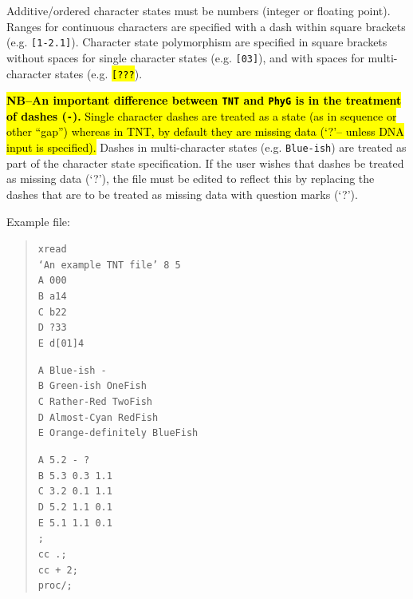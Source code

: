 \begin{description}
		 Additive/ordered character states must be numbers (integer or floating point). Ranges 
		 for continuous characters are specified with a dash within square brackets (e.g. 
		 \texttt{[1-2.1]}). Character state polymorphism are specified in square brackets without 
		 spaces for single character states (e.g. \texttt{[03]}), and with spaces for multi-character 
		 states (e.g. \hl{\texttt{[???}}).
		  
		 \hl{\textbf{NB--An important difference between \texttt{TNT} and \texttt{PhyG} is in the 
		 treatment of dashes (\texttt{-}).} Single character dashes are treated as a state (as in 
		 sequence or other ``gap'') whereas in TNT, by default they are missing data (`?'-- 
		 unless DNA input is specified).} Dashes in multi-character states (e.g. \texttt{Blue-ish}) 
		 are treated as part of the character state specification. If the user wishes that dashes 
		 be treated as missing data (`?'), the file must be edited to reflect this by replacing the 
		 dashes that are to be treated as missing data with question 
		 marks (`?').
		  
		  Example file:
		  	\begin{quote}
			  	\texttt{xread\\
				  	`An example TNT file' 8 5\\
				  	A 000\\
				  	B a14\\
				  	C b22\\
				  	D ?33\\
				  	E d[01]4\\}
			  	
			  	\texttt{A Blue-ish -\\
				  	B Green-ish OneFish\\
				  	C Rather-Red TwoFish\\
				  	D Almost-Cyan RedFish\\
				  	E Orange-definitely BlueFish\\}
					
				\texttt{A 5.2 - ?\\
					 B 5.3 0.3 1.1\\
					 C 3.2 0.1 1.1\\
					 D 5.2 1.1 0.1\\
					 E 5.1 1.1 0.1\\
				  	;\\
				  	cc .;\\
				  	cc + 2;\\
				  	proc/;\\}
			  \end{quote}
	\end{description}	
		
